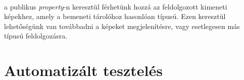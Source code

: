 \paragraph{} a publikus \emph{property}-n keresztül férhetünk hozzá az feldolgozott kimeneti képekhez, amely a bemeneti tárolóhoz hasonlóan  típusú. Ezen keresztül lehetőségünk van továbbadni a képeket megjelenítésre, vagy esetlegesen más típusú feldolgozásra.



\section{Automatizált tesztelés}

